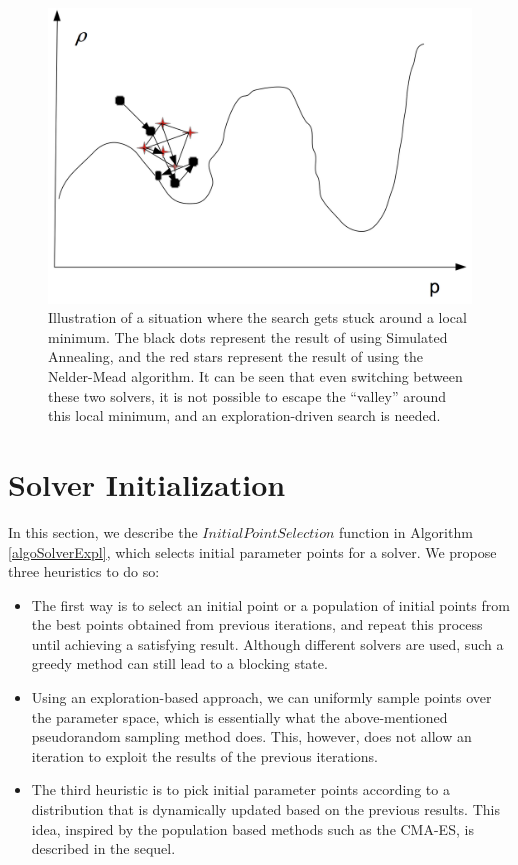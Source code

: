 \begin{figure}
\includegraphics[scale=0.3]{LocalOptimum.png}
\caption{Illustration of a situation where the search gets stuck around a local minimum. The black dots represent the result of using Simulated Annealing, and the red stars represent the result of using the Nelder-Mead algorithm. It can be seen that even switching between these two solvers, it is not possible to escape the ``valley'' around this local minimum, and an exploration-driven search is needed.} 
\end{figure}

\section{Solver Initialization}\label{sec:init}

In this section, we describe the $InitialPointSelection$ function in Algorithm \ref{algoSolverExpl}, which selects initial parameter points for a solver. We propose three heuristics to do so:
\begin{itemize}
\item The first way is to select an initial point or a population of initial points from the best points obtained from previous iterations, and repeat this process until achieving a satisfying result. Although different solvers are used, such a greedy method can still lead to a blocking state. 
\item Using an exploration-based approach, we can uniformly sample points over the parameter space, which is essentially what the above-mentioned pseudorandom sampling method does. This, however, does not allow an iteration to exploit the results of the previous iterations. 
\item The third heuristic is to pick initial parameter points according to a distribution that is dynamically updated based on the previous results. This idea, inspired by the population based methods such as the CMA-ES, is described in the sequel. 
\end{itemize}
